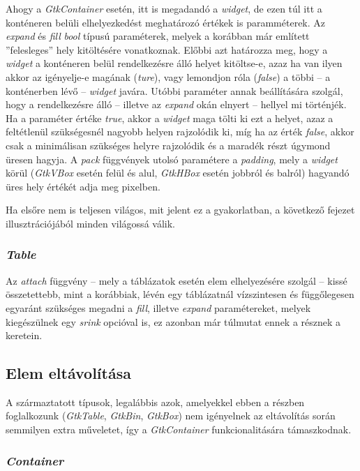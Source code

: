 \documentclass[a4paper,10pt]{article}
\begin{document}
Ahogy a \textit{GtkContainer} esetén, itt is megadandó a \textit{widget}, de ezen túl itt a konténeren belüli elhelyezkedést meghatározó értékek is paramméterek. Az \textit{expand} és \textit{fill} \textit{bool} típusú paraméterek, melyek a korábban már említett ''felesleges'' hely kitöltésére vonatkoznak. Előbbi azt határozza meg, hogy a \textit{widget} a konténeren belül rendelkezésre álló helyet kitöltse-e, azaz ha van ilyen akkor az igényelje-e magának (\textit{ture}), vagy lemondjon róla (\textit{false}) a többi -- a konténerben lévő -- \textit{widget} javára. Utóbbi paraméter annak beállítására szolgál, hogy a rendelkezésre álló -- illetve az \textit{expand} okán elnyert -- hellyel mi történjék. Ha a paraméter értéke \textit{true}, akkor a \textit{widget} maga tölti ki ezt a helyet, azaz a feltétlenül szükségesnél nagyobb helyen rajzolódik ki, míg ha az érték \textit{false}, akkor csak a minimálisan szükséges helyre rajzolódik és a maradék részt úgymond üresen hagyja. A \textit{pack} függvények utolsó paramétere a \textit{padding}, mely a \textit{widget} körül (\textit{GtkVBox} esetén felül és alul, \textit{GtkHBox} esetén jobbról és balról) hagyandó üres hely értékét adja meg pixelben.

Ha elsőre nem is teljesen világos, mit jelent ez a gyakorlatban, a következő fejezet illusztrációjából minden világossá válik.

\subsubsection{\textit{Table}}

Az \textit{attach} függvény -- mely a táblázatok esetén elem elhelyezésére szolgál -- kissé összetettebb, mint a korábbiak, lévén egy táblázatnál vízszintesen és függőlegesen egyaránt szükséges megadni a \textit{fill}, illetve \textit{expand} paramétereket, melyek kiegészülnek egy \textit{srink} opcióval is, ez azonban már túlmutat ennek a résznek a keretein.

\subsection{Elem eltávolítása}

A származtatott típusok, legalábbis azok, amelyekkel ebben a részben foglalkozunk (\textit{GtkTable}, \textit{GtkBin}, \textit{GtkBox}) nem igényelnek az eltávolítás során semmilyen extra műveletet, így a \textit{GtkContainer} funkcionalitására támaszkodnak.

\subsubsection{\textit{Container}}
\end{document}
